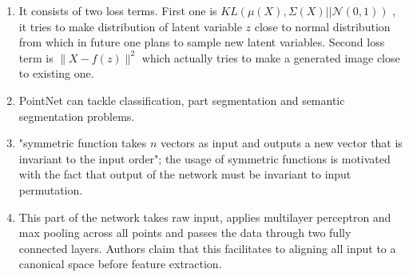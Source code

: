 \documentclass{article}
\begin{document}
\begin{enumerate}[label=(\alph*)]
	\item It consists of two loss terms. First one is $KL(\mu(X), \Sigma(X) || \mathcal{N}(0, 1))$ , it tries to make distribution of latent variable $z$ close to normal distribution from which in future one plans to sample new latent variables. Second loss term is $\|X - f(z)\|^2$ which actually tries to make a generated image close to existing one. 
	\item PointNet can tackle classification, part segmentation and semantic segmentation problems.
	\item "symmetric function takes $n$ vectors as input and outputs a new vector that is invariant to the input order"; the usage of symmetric functions is motivated with the fact that output of the network must be invariant to input permutation.
	\item This part of the network takes raw input, applies multilayer perceptron and max pooling across all points and passes the data through two fully connected layers. Authors claim that this facilitates to aligning all input to a canonical space before feature extraction.
\end{enumerate}
\end{document}
